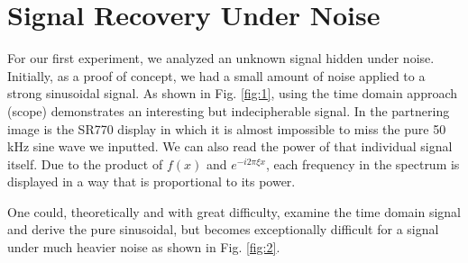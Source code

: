 \documentclass[prl,twocolumn,superscriptaddress,floatfix]{revtex4}
\begin{document}
\section{Signal Recovery Under Noise} 
For our first experiment, we analyzed an unknown signal hidden under noise. Initially, as a proof of concept, we had a small amount of noise applied to a strong sinusoidal signal.
As shown in Fig. \ref{fig:1}, using the time domain approach (scope) demonstrates an interesting but indecipherable signal.
In the partnering image is the SR770 display in which it is almost impossible to miss the pure 50 kHz sine wave we inputted. 
We can also read the power of that individual signal itself. Due to the product of $f(x)$ and $e^{-i2 \pi \xi x}$, each frequency in the spectrum is displayed in a way that is proportional to its power.

One could, theoretically and with great difficulty, examine the time domain signal and derive the pure sinusoidal, but
becomes exceptionally difficult for a signal under much heavier noise as shown in Fig. \ref{fig:2}. 
\end{document}
